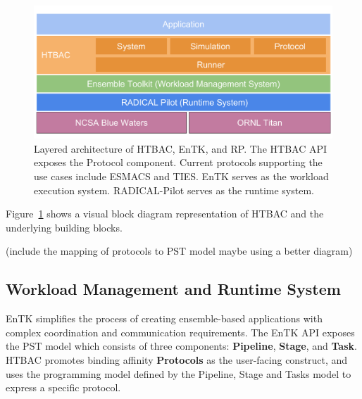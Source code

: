 \begin{figure}
  \centering
  \includegraphics[width=\columnwidth]{figures/building_blocks.pdf}
  \caption{Layered architecture of HTBAC, EnTK, and RP. The HTBAC API
  exposes the Protocol component. Current protocols supporting the use cases
  include ESMACS and TIES. EnTK serves as the workload execution system.
  RADICAL-Pilot serves as the runtime system.}
\label{fig:blockdiagram}
\end{figure}

Figure~\ref{fig:blockdiagram} shows a visual block diagram representation
 of HTBAC and the underlying building
blocks.

(include the mapping of protocols to PST model maybe using a better
diagram)

\subsection{Workload Management and Runtime System}

EnTK simplifies the process of creating ensemble-based applications with
complex coordination and communication requirements. The EnTK API exposes the
PST model which consists of three components: \textbf{Pipeline}, \textbf{Stage}, and \textbf{Task}. HTBAC
promotes binding affinity \textbf{Protocols} as the user-facing construct,
and uses the programming model defined by the Pipeline, Stage and Tasks model
to express a specific protocol. 

